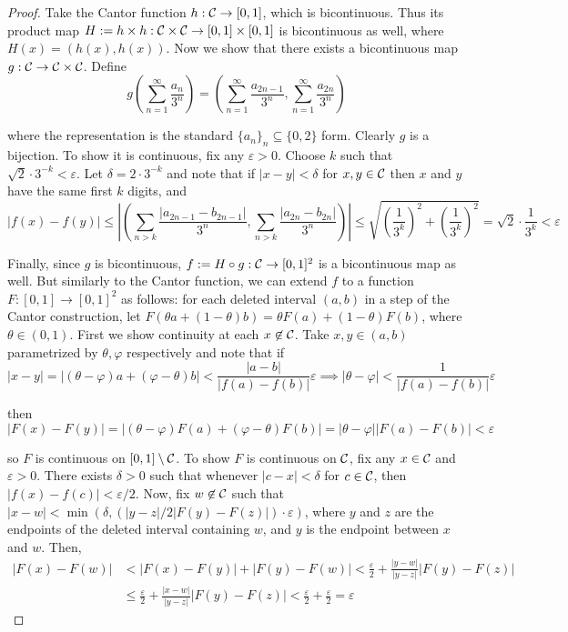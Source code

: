 \begin{proof}
    Take the Cantor function \(h : \mathcal{C} \to [0, 1]\), which is bicontinuous. Thus its product map \(H := h \times h : \mathcal{C} \times \mathcal{C} \to [0,1] \times [0,1]\) is bicontinuous as well, where \(H(x) = (h(x), h(x))\). Now we show that there exists a bicontinuous map \(g : \mathcal{C} \to \mathcal{C} \times \mathcal{C}\). Define
    \[
        g \left( \sum_{n=1}^\infty \frac{a_n}{3^n} \right) 
        = \left( \sum_{n=1}^\infty \frac{a_{2n-1}}{3^n}, \sum_{n=1}^\infty \frac{a_{2n}}{3^n} \right)
    \]

    where the representation is the standard \(\{a_n\}_n \subseteq \{0, 2\}\) form. Clearly \(g\) is a bijection. To show it is continuous, fix any \(\varepsilon > 0\). Choose \(k\) such that \(\sqrt{2} \cdot 3^{-k} < \varepsilon\). Let \(\delta = 2 \cdot 3^{-k}\) and note that if \(|x - y| < \delta\) for \(x,y \in \mathcal{C}\) then \(x\) and \(y\) have the same first \(k\) digits, and 
    \[
        |f(x) - f(y)|
        \leq \left| \left( \sum_{n > k} \frac{|a_{2n-1} - b_{2n-1}|}{3^n}, \sum_{n > k} \frac{|a_{2n} - b_{2n}|}{3^n} \right) \right| 
        \leq \sqrt{\left(\frac{1}{3^k}\right)^2 + \left(\frac{1}{3^k} \right)^2}
        = \sqrt{2} \cdot \frac{1}{3^k} 
        < \varepsilon
    \]

    Finally, since \(g\) is bicontinuous, \(f := H \circ g : \mathcal{C} \to [0, 1]^2\) is a bicontinuous map as well. But similarly to the Cantor function, we can extend \(f\) to a function \(F : [0, 1] \to [0, 1]^2\) as follows: for each deleted interval \((a, b)\) in a step of the Cantor construction, let \(F(\theta a + (1 - \theta)b) = \theta F(a) + (1 - \theta) F(b)\), where \(\theta \in (0, 1)\). First we show continuity at each \(x \not\in \mathcal{C}\). Take \(x, y \in (a, b)\) parametrized by \(\theta, \varphi\) respectively and note that if
    \[
        |x - y| = |(\theta - \varphi)a + (\varphi - \theta)b| 
        < \frac{|a - b|}{|f(a) - f(b)|} \varepsilon
        \implies |\theta - \varphi| < \frac{1}{|f(a) - f(b)|} \varepsilon
    \]

    then 
    \[
        |F(x) - F(y)|
        = |(\theta - \varphi) F(a) + (\varphi - \theta) F(b)|
        = |\theta - \varphi| |F(a) - F(b)|
        < \varepsilon
    \]

    so \(F\) is continuous on \([0,1] \setminus \mathcal{C}\). To show \(F\) is continuous on \(\mathcal{C}\), fix any \(x \in \mathcal{C}\) and \(\varepsilon > 0\). There exists \(\delta > 0\) such that whenever \(|c - x| < \delta\) for \(c \in \mathcal{C}\), then \(|f(x) - f(c)| < \varepsilon / 2\). Now, fix \(w \not\in \mathcal{C}\) such that \(|x - w| < \min(\delta, (|y - z| / 2|F(y) - F(z)|) \cdot \varepsilon)\), where \(y\) and \(z\) are the endpoints of the deleted interval containing \(w\), and \(y\) is the endpoint between \(x\) and \(w\). Then, 
    \begin{align*}
        |F(x) - F(w)|
        &< |F(x) - F(y)| + |F(y) - F(w)|
        < \frac{\varepsilon}{2} + \frac{|y - w|}{|y - z|} |F(y) - F(z)| \\
        &\leq \frac{\varepsilon}{2} + \frac{|x -w|}{|y - z|} |F(y) - F(z)|
        < \frac{\varepsilon}{2} + \frac{\varepsilon}{2} 
        = \varepsilon
    \end{align*}


\end{proof}
